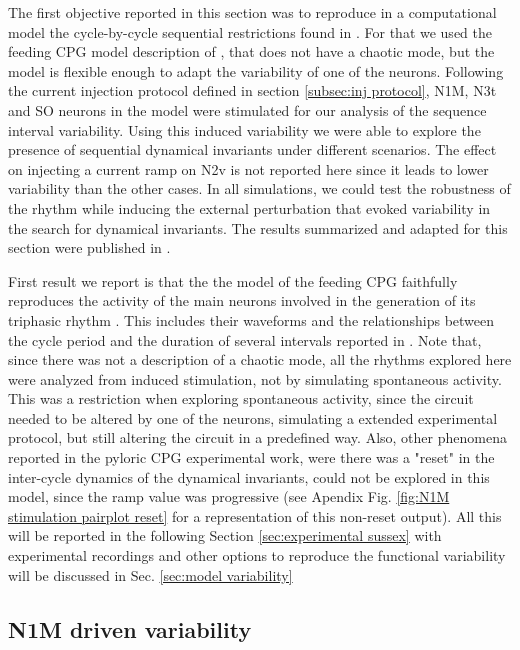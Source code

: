 The first objective reported in this section was to reproduce in a computational model the cycle-by-cycle sequential restrictions found in \cite{elices_robust_2019}. For that we used the feeding CPG model description of \cite{vavoulis_dynamic_2007}, that does not have a chaotic mode, but the model is flexible enough to adapt the variability of one of the neurons. Following the current injection protocol defined in section \ref{subsec:inj protocol}, N1M, N3t and SO neurons in the model were stimulated for our analysis of the sequence interval variability. Using this induced variability we were able to explore the presence of sequential dynamical invariants under different scenarios. The effect on injecting a current ramp on N2v is not reported here since it leads to lower variability than the other cases. In all simulations, we could test the robustness of the rhythm while inducing the external perturbation that evoked variability in the search for dynamical invariants. The results summarized and adapted for this section were published in \cite{garrido-pena_characterization_2021}.

First result we report is that the the model of the feeding CPG faithfully reproduces the activity of the main neurons involved in the generation of its triphasic rhythm \parencite{vavoulis_dynamical_2007}. This includes their waveforms and the relationships between the cycle period and the duration of several intervals reported in \parencite{elliott_temporal_1991}. Note that, since there was not a description of a chaotic mode, all the rhythms explored here were analyzed from induced stimulation, not by simulating spontaneous activity. This was a restriction when exploring spontaneous activity, since the circuit needed to be altered by one of the neurons, simulating a extended experimental protocol, but still altering the circuit in a predefined way. Also, other phenomena reported in the pyloric CPG experimental work, were there was a "reset" in the inter-cycle dynamics of the dynamical invariants, could not be explored in this model, since the ramp value was progressive (see Apendix Fig. \ref{fig:N1M stimulation pairplot reset} for a representation of this non-reset output). All this will be reported in the following Section \ref{sec:experimental sussex} with experimental recordings and other options to reproduce the functional variability will be discussed in Sec. \ref{sec:model variability}

\subsection{N1M driven variability}
\label{subsec:n1m driven}

